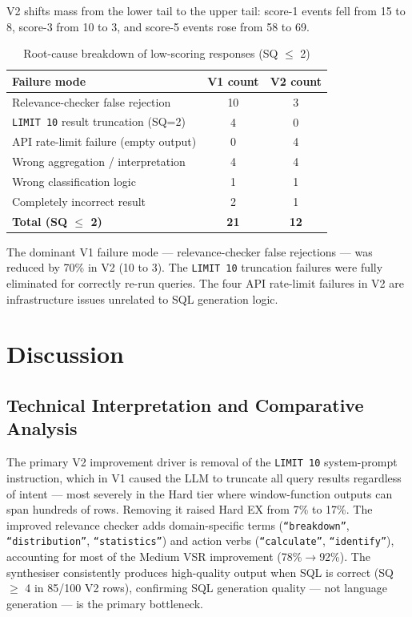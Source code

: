 \documentclass{article}
\begin{document}
V2 shifts mass from the lower tail to the upper tail: score-1 events fell from 15 to 8, score-3 from 10 to 3, and score-5 events rose from 58 to 69.

\begin{table}[h]
\centering
\caption{Root-cause breakdown of low-scoring responses (SQ $\leq$ 2)}
\label{tab:failures}
\begin{tabular}{lcc}
\toprule
\textbf{Failure mode} & \textbf{V1 count} & \textbf{V2 count} \\
\midrule
Relevance-checker false rejection & 10 & 3 \\
\texttt{LIMIT 10} result truncation (SQ=2) & 4 & 0 \\
API rate-limit failure (empty output) & 0 & 4 \\
Wrong aggregation / interpretation & 4 & 4 \\
Wrong classification logic & 1 & 1 \\
Completely incorrect result & 2 & 1 \\
\midrule
\textbf{Total (SQ $\leq$ 2)} & \textbf{21} & \textbf{12} \\
\bottomrule
\end{tabular}
\end{table}

The dominant V1 failure mode --- relevance-checker false rejections --- was reduced by 70\% in V2 (10 to 3). The \texttt{LIMIT 10} truncation failures were fully eliminated for correctly re-run queries. The four API rate-limit failures in V2 are infrastructure issues unrelated to SQL generation logic.

\section{Discussion}

\subsection{Technical Interpretation and Comparative Analysis}

The primary V2 improvement driver is removal of the \texttt{LIMIT 10} system-prompt instruction, which in V1 caused the LLM to truncate all query results regardless of intent --- most severely in the Hard tier where window-function outputs can span hundreds of rows. Removing it raised Hard EX from 7\% to 17\%. The improved relevance checker adds domain-specific terms (\texttt{``breakdown''}, \texttt{``distribution''}, \texttt{``statistics''}) and action verbs (\texttt{``calculate''}, \texttt{``identify''}), accounting for most of the Medium VSR improvement (78\%$\rightarrow$92\%). The synthesiser consistently produces high-quality output when SQL is correct (SQ $\geq$ 4 in 85/100 V2 rows), confirming SQL generation quality --- not language generation --- is the primary bottleneck.
\end{document}
